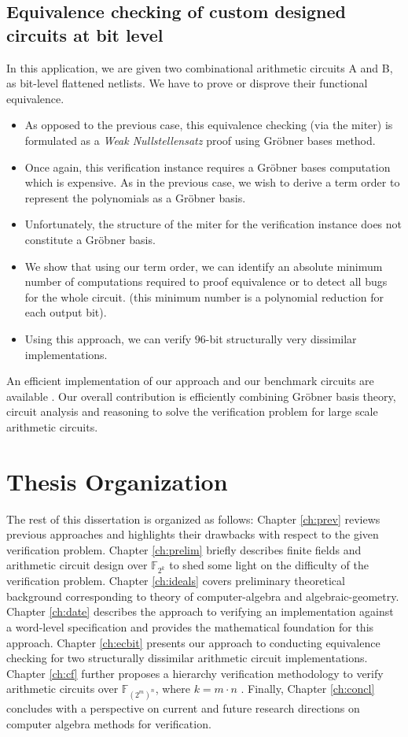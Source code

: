 \subsection{Equivalence checking of custom designed circuits at bit level}
In this application, we are given two combinational arithmetic circuits A and B, as bit-level flattened netlists.
We have to prove or disprove their functional equivalence. 
\begin{itemize}
	\item{As opposed to the previous case, this equivalence checking (via the miter) is formulated as a 
	{\it Weak Nullstellensatz} proof using Gr\"obner bases method}.
	\item{Once again, this verification instance requires a Gr\"obner bases computation which is expensive. 
	As in the previous case, we wish to derive a term order to represent the polynomials as a Gr\"obner basis}.
	\item{Unfortunately, the structure of the miter for the  verification instance does not constitute a Gr\"obner basis}.
	\item{We show that using our term order, we can identify an absolute minimum number of computations required to proof equivalence or 
	to detect all bugs for the whole circuit. (this minimum number is a polynomial reduction for each output bit)}.
	\item{Using this approach, we can verify $96$-bit structurally very dissimilar implementations}.
\end{itemize}
An efficient implementation of our approach and our benchmark circuits are available \cite{satsmtbench:2011}. 
Our overall contribution is efficiently combining Gr\"obner basis theory, circuit analysis and 
reasoning to solve the verification problem for large scale arithmetic circuits. 


\section{Thesis Organization}

The rest of this dissertation is organized as follows: 
Chapter \ref{ch:prev} reviews previous approaches and highlights their drawbacks with respect to the given
verification problem. 
Chapter \ref{ch:prelim} briefly describes finite fields and arithmetic circuit design over $\mathbb{F}_{2^k}$ 
to shed some light on the difficulty of the verification problem.
Chapter \ref{ch:ideals} covers preliminary theoretical background 
corresponding to theory of computer-algebra and algebraic-geometry.
Chapter \ref{ch:date} describes the approach to verifying an implementation against a word-level specification
and provides the mathematical foundation for this approach. 
Chapter \ref{ch:ecbit} presents our approach to conducting equivalence checking for 
two structurally dissimilar arithmetic circuit implementations.
Chapter \ref{ch:cf} further proposes a hierarchy verification methodology 
to verify arithmetic circuits over $\mathbb{F}_{(2^m)^{n}}$, where $k=m \cdot n$ .
Finally, Chapter \ref{ch:concl} concludes with a perspective on current and
future research directions on computer algebra methods for verification.

